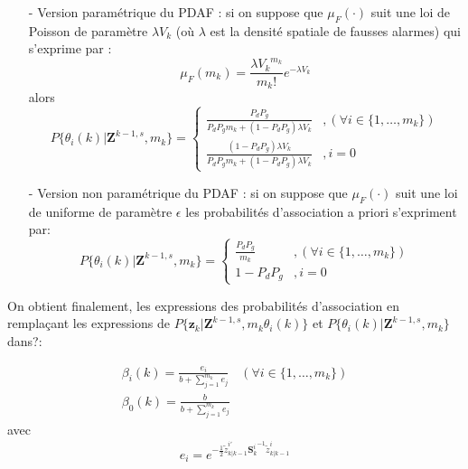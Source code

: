 \documentclass[10pt,french,a4paper]{report}
\begin{document}
	\begin{itemize}
	\item[-] Version paramétrique du \acf{PDAF} : si on suppose que $\mu_F(\cdot)$  suit une loi de Poisson de paramètre $\lambda V_k$ (où $\lambda$ est la densité spatiale de fausses alarmes) qui s'exprime par :
	 \begin{equation}
	\mu_F(m_k) = \frac{{\lambda V_k}^{m_k}}{m_k!}e^{-\lambda V_k}
	\end{equation}
	alors
	 \begin{equation}
	P\{\theta_i(k)| \mathbf{Z}^{k-1,s},m_k  \} = \left\{ \begin{aligned}
	\frac{P_dP_g}{P_dP_gm_k+(1-P_dP_g)\lambda V_k} &,(\forall i \in \{1,\ldots,m_k\}) \\
	\frac{(1-P_dP_g)\lambda V_k}{P_dP_gm_k+(1-P_dP_g)\lambda V_k}  &, i = 0
	\end{aligned} \right.
	\end{equation}
	\item[-] Version non paramétrique du \acf{PDAF} : si on suppose que $\mu_F(\cdot)$  suit une loi de uniforme de paramètre $\epsilon$  les probabilités d'association a priori s'expriment par:
	 \begin{equation}
	P\{\theta_i(k)| \mathbf{Z}^{k-1,s},m_k  \} = \left\{ \begin{aligned}
	\frac{P_dP_g}{m_k} &,(\forall i \in \{1,\ldots,m_k\}) \\
	1-P_dP_g  &, i = 0
	\end{aligned} \right.
	\end{equation} 
	\end{itemize}
	
	On obtient finalement, les expressions des probabilités d'association en remplaçant les expressions de  $P\{\mathbf{z}_k| \mathbf{Z}^{k-1,s},m_k \theta_i(k) \} $ et $P\{\theta_i(k)| \mathbf{Z}^{k-1,s},m_k  \}$ dans?:
	
	 \begin{equation}
	 \begin{aligned}
	 \beta_i(k) = \frac{e_i}{b+\sum_{j=1}^{m_k}e_j} & (\forall i \in \{1,\ldots,m_k\})\\
	  \beta_0( k) = \frac{b}{b+\sum_{j=1}^{m_k}e_j}& 
	\end{aligned}  
	\end{equation} 
	avec 
	 \begin{equation}
	 \begin{aligned}
	e_i = e^{ -\frac{1}{2} \tilde{z}^{i'}_{k|k-1} {\mathbf{S}_k^i}^{-1} \tilde{z}^i_{k|k-1} }
	\end{aligned}  
	\end{equation} 
	
\end{document}
